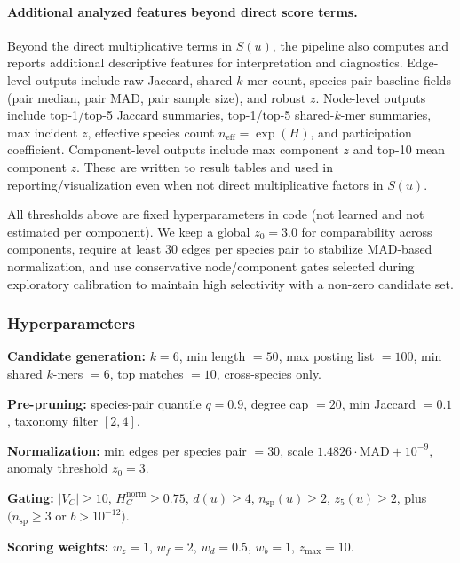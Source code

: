 \documentclass{article}
\begin{document}
\paragraph{Additional analyzed features beyond direct score terms.}
Beyond the direct multiplicative terms in $S(u)$, the pipeline also computes and reports additional descriptive features for interpretation and diagnostics. Edge-level outputs include raw Jaccard, shared-$k$-mer count, species-pair baseline fields (pair median, pair MAD, pair sample size), and robust $z$. Node-level outputs include top-1/top-5 Jaccard summaries, top-1/top-5 shared-$k$-mer summaries, max incident $z$, effective species count $n_{\mathrm{eff}}=\exp(H)$, and participation coefficient. Component-level outputs include max component $z$ and top-10 mean component $z$. These are written to result tables and used in reporting/visualization even when not direct multiplicative factors in $S(u)$.

All thresholds above are fixed hyperparameters in code (not learned and not estimated per component). We keep a global $z_0=3.0$ for comparability across components, require at least 30 edges per species pair to stabilize MAD-based normalization, and use conservative node/component gates selected during exploratory calibration to maintain high selectivity with a non-zero candidate set.
\subsubsection*{Hyperparameters}

\textbf{Candidate generation:}
$k=6$, min length $=50$, max posting list $=100$, min shared $k$-mers $=6$, top matches $=10$, cross-species only.

\textbf{Pre-pruning:}
species-pair quantile $q=0.9$, degree cap $=20$, min Jaccard $=0.1$, taxonomy filter $[2,4]$.

\textbf{Normalization:}
min edges per species pair $=30$, scale $1.4826\cdot \mathrm{MAD} + 10^{-9}$, anomaly threshold $z_0=3$.

\textbf{Gating:}
$|V_C|\ge10$, $H_C^{\mathrm{norm}}\ge0.75$, $d(u)\ge4$, $n_{\mathrm{sp}}(u)\ge2$, $z_5(u)\ge2$, plus $(n_{\mathrm{sp}}\ge3$ or $b>10^{-12})$.

\textbf{Scoring weights:}
$w_z=1$, $w_f=2$, $w_d=0.5$, $w_b=1$, $z_{\max}=10$.
\end{document}

